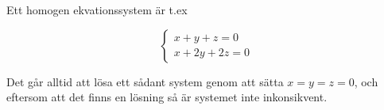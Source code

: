 \documentclass[../../main.tex]{subfiles}
\begin{document}
\begin{solution}{5}

Ett homogen ekvationssystem är t.ex

$$
\begin{cases}
x + y + z = 0\\
x + 2y +2 z = 0
\end{cases}
$$

Det går alltid att lösa ett sådant system genom att sätta $x = y = z = 0$, och eftersom att det finns en lösning så är systemet inte inkonsikvent.

\end{solution}
\end{document}
